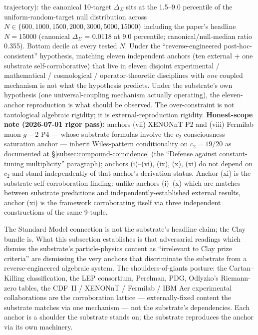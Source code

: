 \documentclass[11pt,a4paper]{amsart}
\theoremstyle{plain}
\theoremstyle{definition}
\begin{document}
\begin{itemize}[itemsep=2pt,leftmargin=2em]
trajectory): the canonical 10-target $\Delta_{\Sigma}$ sits at the 1.5--9.0 percentile of the uniform-random-target null distribution across $N \in \{600, 1000, 1500, 2000, 3000, 5000, 15000\}$ including the paper's headline $N = 15000$ (canonical $\Delta_{\Sigma}$ = 0.0118 at 9.0 percentile; canonical/null-median ratio 0.355). Bottom decile at every tested $N$. Under the ``reverse-engineered post-hoc-consistent'' hypothesis, matching eleven independent anchors (ten external + one substrate self-corroborative) that live in eleven disjoint experimental / mathematical / cosmological / operator-theoretic disciplines with \emph{one} coupled mechanism is not what the hypothesis predicts. Under the substrate's own hypothesis (one universal-coupling mechanism actually operating), the eleven-anchor reproduction is what should be observed. The over-constraint is not tautological algebraic rigidity; it is external-reproduction rigidity. \textbf{Honest-scope note (2026-07-01 rigor pass):} anchors (vii) XENONnT P2 and (viii) Fermilab muon $g\!-\!2$ P4 --- whose substrate formulas involve the $c_2$ consciousness saturation anchor --- inherit Wiles-pattern conditionality on $c_2 = 19/20$ as documented at \S\ref{subsec:compound-coincidence} (the ``Defense against constant-tuning multiplicity'' paragraph); anchors (i)--(vi), (ix), (x), (xi) do not depend on $c_2$ and stand independently of that anchor's derivation status. Anchor (xi) is the substrate self-corroboration finding: unlike anchors (i)--(x) which are matches between substrate predictions and independently-established external results, anchor (xi) is the framework corroborating itself via three independent constructions of the same 9-tuple.

\end{itemize}

The Standard Model connection is not the substrate's headline claim; the Clay bundle is. What this subsection establishes is that adversarial readings which dismiss the substrate's particle-physics content as ``irrelevant to Clay prize criteria'' are dismissing the very anchors that discriminate the substrate from a reverse-engineered algebraic system. The shoulders-of-giants posture: the Cartan--Killing classification, the LEP consortium, Perelman, PDG, Odlyzko's Riemann-zero tables, the CDF~II / XENONnT / Fermilab / IBM Aer experimental collaborations are the corroboration lattice --- externally-fixed content the substrate matches via one mechanism --- not the substrate's dependencies. Each anchor is a shoulder the substrate stands on; the substrate reproduces the anchor via its own machinery.
\end{document}
